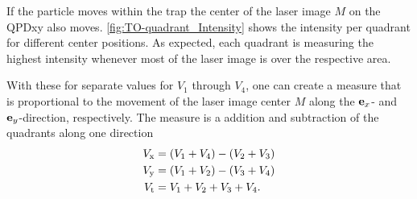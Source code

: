If the particle moves within the trap the center of the laser image $M$ on the 
QPDxy also moves. \cref{fig:TO-quadrant_Intensity} shows the intensity per 
quadrant for different center positions. As expected, each quadrant is 
measuring the highest intensity whenever most of the laser image is over the 
respective area.

With these for separate values for $V_{1}$ through $V_{4}$, one can create a 
measure that is proportional to the movement of the laser image center $M$ 
along the $\vb{e}_{x}$- and $\vb{e}_{y}$-direction, respectively. The measure is a addition 
and subtraction of the quadrants along one direction
\begin{subequations}
\begin{align}
  V_{\mathrm{x}} & = \left( V_{\mathrm{1}}+V_{\mathrm{4}} \right) - \left( V_{\mathrm{2}} + 
  V_{\mathrm{3}}  \right)
  \label{eq:TO-Vx} \\
  V_{\mathrm{y}} & = \left( V_{\mathrm{1}}+V_{\mathrm{2}} \right) - \left( V_{\mathrm{3}} + 
  V_{\mathrm{4}}  \right)
  \label{eq:TO-Vy} \\
  V_{\mathrm{t}} & = V_{\mathrm{1}}+V_{\mathrm{2}} + V_{\mathrm{3}} + V_{\mathrm{4}}.
  \label{eq:TO-Vt}
\end{align}
\end{subequations}

